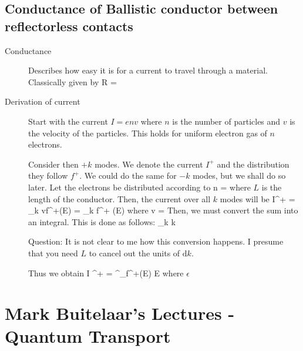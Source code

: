 \subsection{Conductance of Ballistic conductor between reflectorless contacts}
\begin{description}
\item[Conductance] Describes how easy it is for a current to travel through a material. Classically given by 
\beq
R = \sigma {}
\eeq

\item[Derivation of current] Start with the current $I = env$ where $n$ is the number of particles and $v$ is the velocity of the particles. This holds for uniform electron gas of $n$ electrons. 

Consider then $+k$ modes. We denote the current $I^+$ and the distribution they follow $f^+$. We could do the same for $-k$ modes, but we shall do so later. Let the electrons be distributed according to 
\beq
n = 
\eeq
where $L$ is the length of the conductor. Then, the current over all $k$ modes will be
\beq
I^+ =  \sum_k vf^+(E) =  \sum_k   f^+ (E)
\eeq
where
\beq
v  =  
\eeq
Then, we must convert the sum into an integral. This is done as follows:
\beq
\sum_k  \times {} \int {}k
\eeq

Question: It is not clear to me how this conversion happens. I presume that you need $L$ to cancel out the units of $\mathrm{d} k $. 

Thus we obtain 
\beq
I ^+ =  \int^\infty_\epsilon f^+(E)  E
\eeq
where $\epsilon$

\end{description}

\newpage
\section{Mark Buitelaar's Lectures - Quantum Transport}
